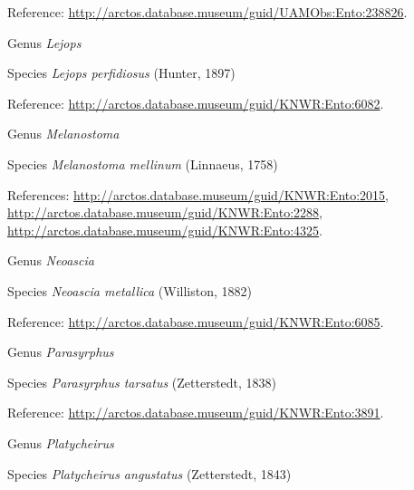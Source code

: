 \documentclass[9pt, article]{memoir}
\begin{document}
\begin{multicols}{2}
Reference: 
\url{http://arctos.database.museum/guid/UAMObs:Ento:238826}.

\vspace{6pt}\noindent\hspace{30pt}Genus \textit{Lejops}


\vspace{6pt}\noindent\hspace{36pt}Species \textit{Lejops perfidiosus} (Hunter, 1897)


Reference: 
\url{http://arctos.database.museum/guid/KNWR:Ento:6082}.

\vspace{6pt}\noindent\hspace{30pt}Genus \textit{Melanostoma}


\vspace{6pt}\noindent\hspace{36pt}Species \textit{Melanostoma mellinum} (Linnaeus, 1758)


References: 
\url{http://arctos.database.museum/guid/KNWR:Ento:2015}, 
\url{http://arctos.database.museum/guid/KNWR:Ento:2288}, 
\url{http://arctos.database.museum/guid/KNWR:Ento:4325}.

\vspace{6pt}\noindent\hspace{30pt}Genus \textit{Neoascia}


\vspace{6pt}\noindent\hspace{36pt}Species \textit{Neoascia metallica} (Williston, 1882)


Reference: 
\url{http://arctos.database.museum/guid/KNWR:Ento:6085}.

\vspace{6pt}\noindent\hspace{30pt}Genus \textit{Parasyrphus}


\vspace{6pt}\noindent\hspace{36pt}Species \textit{Parasyrphus tarsatus} (Zetterstedt, 1838)


Reference: 
\url{http://arctos.database.museum/guid/KNWR:Ento:3891}.

\vspace{6pt}\noindent\hspace{30pt}Genus \textit{Platycheirus}


\vspace{6pt}\noindent\hspace{36pt}Species \textit{Platycheirus angustatus} (Zetterstedt, 1843)



\end{multicols}
\end{document}
